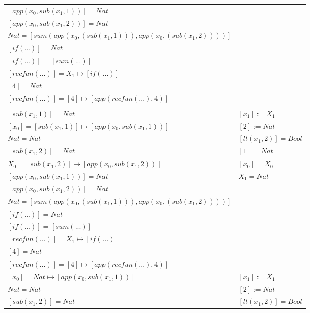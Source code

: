 \begin{exercise}
\begin{description}
\begin{center}
\begin{longtable}{ | l | l | }
                        $[app(x_0, sub(x_1,1))] = Nat$ & \\
                        $[app(x_0, sub(x_1,2))] = Nat$ & \\
                        $Nat = [sum(app(x_0, (sub(x_1,1))), app(x_0, (sub(x_1,2))))]$ & \\
                        $[if(...)] = Nat$ & \\
                        $[if(...)] = [sum(...)]$ & \\
                        $[recfun(...)] = X_1 \mapsto [if(...)]$ & \\
                        $[4] = Nat$ & \\
                        $[recfun(...)] = [4] \mapsto [app(recfun(...), 4)]$ & \\
                    \hline &  \\
                        $[sub(x_1,1)] = Nat$ &  $[x_1] := X_1$ \\
                        $[x_0] = [sub(x_1,1)] \mapsto [app(x_0, sub(x_1,1))]$ & $[2] := Nat$ \\
                        $Nat = Nat$ & $[lt(x_1 , 2)] = Bool$ \\
                        $[sub(x_1,2)] = Nat$ & $[1] = Nat$ \\
                        $X_0 = [sub(x_1,2)] \mapsto [app(x_0, sub(x_1,2))]$ & $[x_0] = X_0$  \\
                        $[app(x_0, sub(x_1,1))] = Nat$ & $X_1 = Nat$\\
                        $[app(x_0, sub(x_1,2))] = Nat$ & \\
                        $Nat = [sum(app(x_0, (sub(x_1,1))), app(x_0, (sub(x_1,2))))]$ & \\
                        $[if(...)] = Nat$ & \\
                        $[if(...)] = [sum(...)]$ & \\
                        $[recfun(...)] = X_1 \mapsto [if(...)]$ & \\
                        $[4] = Nat$ & \\
                        $[recfun(...)] = [4] \mapsto [app(recfun(...), 4)]$ & \\
                    \hline
                        $[x_0] = Nat \mapsto [app(x_0, sub(x_1,1))]$ &   $[x_1] := X_1$ \\
                        $Nat = Nat$ & $[2] := Nat$ \\
                        $[sub(x_1,2)] = Nat$ & $[lt(x_1 , 2)] = Bool$ \\

\end{longtable}
\end{center}
\end{description}
\end{exercise}
